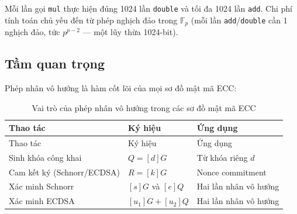 Mỗi lần gọi \texttt{mul} thực hiện đúng 1024 lần \texttt{double} và tối
đa 1024 lần \texttt{add}. Chi phí tính toán chủ yếu đến từ phép nghịch
đảo trong \(\mathbb{F}_p\) (mỗi lần \texttt{add}/\texttt{double} cần 1
nghịch đảo, tức \(p^{p-2}\) --- một lũy thừa 1024-bit).

\subsection{Tầm quan trọng}\label{tux1ea7m-quan-trux1ecdng}

Phép nhân vô hướng là hàm cốt lõi của mọi sơ đồ mật mã ECC:

\begin{longtable}[]{@{}
  >{\raggedright\arraybackslash}p{}
  >{\raggedright\arraybackslash}p{}
  >{\raggedright\arraybackslash}p{}@{}}
\caption{Vai trò của phép nhân vô hướng trong các sơ đồ mật mã
ECC}\tabularnewline
\toprule\noalign{}
\begin{minipage}[b]{\linewidth}\raggedright
Thao tác
\end{minipage} & \begin{minipage}[b]{\linewidth}\raggedright
Ký hiệu
\end{minipage} & \begin{minipage}[b]{\linewidth}\raggedright
Ứng dụng
\end{minipage} \\
\midrule\noalign{}
\endfirsthead
\toprule\noalign{}
\begin{minipage}[b]{\linewidth}\raggedright
Thao tác
\end{minipage} & \begin{minipage}[b]{\linewidth}\raggedright
Ký hiệu
\end{minipage} & \begin{minipage}[b]{\linewidth}\raggedright
Ứng dụng
\end{minipage} \\
\midrule\noalign{}
\endhead
\bottomrule\noalign{}
\endlastfoot
Sinh khóa công khai & \(Q = [d]G\) & Từ khóa riêng \(d\) \\
Cam kết ký (Schnorr/ECDSA) & \(R = [k]G\) & Nonce commitment \\
Xác minh Schnorr & \([s]G\) và \([e]Q\) & Hai lần nhân vô hướng \\
Xác minh ECDSA & \([u_1]G + [u_2]Q\) & Hai lần nhân vô hướng \\
\end{longtable}

